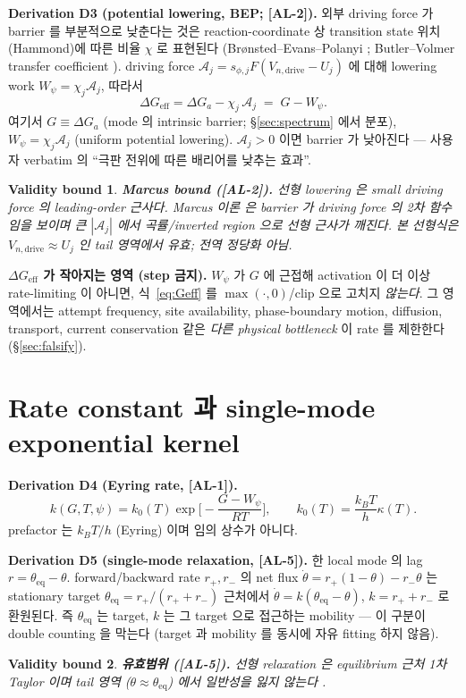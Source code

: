 \documentclass[11pt,a4paper]{article}
\newtheorem*{boundbox}{Validity bound}
\newcommand{\eff}{\mathrm{eff}}
\newcommand{\eq}{\mathrm{eq}}
\newcommand{\dimedrive}{\mathrm{drive}}
\newcommand{\AL}[1]{\textsf{[AL-#1]}}
\begin{document}
\textbf{Derivation D3 (potential lowering, BEP; \AL{2}).} 외부 driving force 가 barrier 를
부분적으로 낮춘다는 것은 reaction-coordinate 상 transition state 위치(Hammond)에 따른
비율 $\chi$ 로 표현된다 (Brønsted--Evans--Polanyi \cite{evanspolanyi1938}; Butler--Volmer
transfer coefficient \cite{bardfaulkner}). driving force $\mathcal A_j=s_{\phi,j}F(V_{n,\dimedrive}
-U_j)$ 에 대해 lowering work $W_\psi=\chi_j\mathcal A_j$, 따라서
\begin{equation}
\boxed{\;\Delta G_{\eff}=\Delta G_a-\chi_j\,\mathcal A_j\;=\;G-W_\psi.\;}
\label{eq:Geff}
\end{equation}
여기서 $G\equiv\Delta G_a$ (mode 의 intrinsic barrier; \S\ref{sec:spectrum} 에서 분포),
$W_\psi=\chi_j\mathcal A_j$ (uniform potential lowering). $\mathcal A_j>0$ 이면 barrier 가
낮아진다 — 사용자 verbatim 의 ``극판 전위에 따른 배리어를 낮추는 효과''.
\begin{boundbox}
\textbf{Marcus bound (\AL{2}).} 선형 lowering 은 small driving force 의 leading-order
근사다. Marcus 이론 \cite{marcus1956} 은 barrier 가 driving force 의 2차 함수임을 보이며
큰 $|\mathcal A_j|$ 에서 곡률/inverted region 으로 선형 근사가 깨진다. 본 선형식은
$V_{n,\dimedrive}\approx U_j$ 인 tail 영역에서 유효; 전역 정당화 아님.
\end{boundbox}
\textbf{$\Delta G_\eff$ 가 작아지는 영역 (step 금지).} $W_\psi$ 가 $G$ 에 근접해 activation
이 더 이상 rate-limiting 이 아니면, 식~\eqref{eq:Geff} 를 $\max(\cdot,0)$/clip 으로 고치지
\emph{않는다}. 그 영역에서는 attempt frequency, site availability, phase-boundary motion,
diffusion, transport, current conservation 같은 \emph{다른 physical bottleneck} 이 rate 를
제한한다 (\S\ref{sec:falsify}).

\section{Rate constant 과 single-mode exponential kernel}\label{sec:rate}
\textbf{Derivation D4 (Eyring rate, \AL{1}).}
\begin{equation}
k(G,T,\psi)=k_0(T)\exp\!\Big[-\frac{G-W_\psi}{RT}\Big],\qquad k_0(T)=\frac{k_BT}{h}\kappa(T).
\label{eq:rate}
\end{equation}
prefactor 는 $k_BT/h$ (Eyring) 이며 임의 상수가 아니다.

\textbf{Derivation D5 (single-mode relaxation, \AL{5}).} 한 local mode 의 lag $r=\theta_\eq-\theta$.
forward/backward rate $r_+,r_-$ 의 net flux $\dot\theta=r_+(1-\theta)-r_-\theta$ 는 stationary
target $\theta_\eq=r_+/(r_++r_-)$ 근처에서 $\dot\theta=k(\theta_\eq-\theta)$, $k=r_++r_-$ 로
환원된다. 즉 $\theta_\eq$ 는 target, $k$ 는 그 target 으로 접근하는 mobility — 이 구분이
double counting 을 막는다 (target 과 mobility 를 동시에 자유 fitting 하지 않음).
\begin{boundbox}
\textbf{유효범위 (\AL{5}).} 선형 relaxation 은 equilibrium 근처 1차 Taylor 이며 tail 영역
($\theta\approx\theta_\eq$) 에서 일반성을 잃지 않는다 \cite{degrootmazur1962,onsager1931}.
\end{boundbox}
\end{document}
